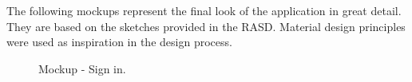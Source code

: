 The following mockups represent the final look of the application in great detail. They are based on the sketches provided in the RASD. Material design principles were used as inspiration in the design process.

{
\setlength{\fboxsep}{0pt}
\begin{figure}[H]
\centering
\begin{minipage}{.4\textwidth}
    \centering
    \caption{\label{fig:mockup-sign-in}Mockup - Sign in.}
\end{minipage}
\begin{minipage}{.4\textwidth}
    \centering

\end{minipage}
\end{figure}}
